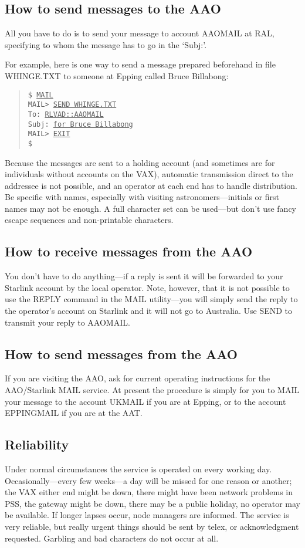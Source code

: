 \subsection{How to send messages to the AAO}
All you have to do is to send your message to account AAOMAIL at RAL, specifying
to whom the message has to go in the `Subj:'.

For example, here is one way to send a message prepared beforehand in file
WHINGE.TXT to someone at Epping called Bruce Billabong:
\begin{quote}
{\tt \$ \underline{MAIL}\\[\medskipamount]
MAIL> \underline{SEND WHINGE.TXT}\\
To:     \underline{RLVAD::AAOMAIL}\\
Subj:   \underline{for Bruce Billabong}\\[\medskipamount]
MAIL> \underline{EXIT}\\[\medskipamount]
\$}
\end{quote}
Because the messages are sent to a holding account (and sometimes are for
individuals without accounts on the VAX), automatic transmission direct to the
addressee is not possible, and an operator at each end has to handle
distribution.
Be specific with names, especially with visiting astronomers---initials or
first names may not be enough.
A full character set can be used---but don't use fancy escape sequences and
non-printable characters.
\subsection{How to receive messages from the AAO}
You don't have to do anything---if a reply is sent it will be forwarded to your
Starlink account by the local operator.
Note, however, that it is not possible to use the REPLY command in the MAIL
utility---you will simply send the reply to the operator's account on Starlink
and it will not go to Australia.
Use SEND to transmit your reply to AAOMAIL.
\subsection{How to send messages from the AAO}
If you are visiting the AAO, ask for current operating instructions for the
AAO/Starlink MAIL service.
At present the procedure is simply for you to MAIL your message to the account
UKMAIL if you are at Epping, or to the account EPPINGMAIL if you are at the AAT.
\subsection{Reliability}
Under normal circumstances the service is operated on every working day.
Occasionally---every few weeks---a day will be missed for one reason or another;
the VAX either end might be down, there might have been network problems in PSS,
the gateway might be down, there may be a public holiday, no operator
may be available.
If longer lapses occur, node managers are informed.
The service is very reliable, but really urgent things should be sent by telex,
or acknowledgment requested.
Garbling and bad characters do not occur at all.
